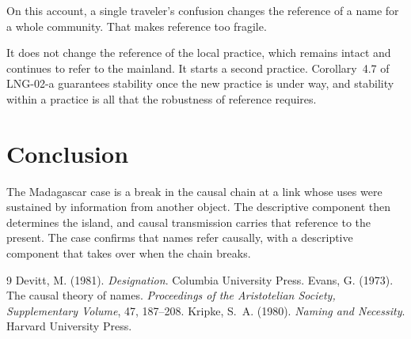 \documentclass{situationist-preprint}
\begin{document}
\begin{objection}
On this account, a single traveler's confusion changes the reference of a name for a whole community. That makes reference too fragile.
\end{objection}

\begin{reply}
It does not change the reference of the local practice, which remains intact and continues to refer to the mainland. It starts a second practice. Corollary~4.7 of LNG-02-a guarantees stability once the new practice is under way, and stability within a practice is all that the robustness of reference requires.
\end{reply}

\section{Conclusion}

The Madagascar case is a break in the causal chain at a link whose uses were sustained by information from another object. The descriptive component then determines the island, and causal transmission carries that reference to the present. The case confirms that names refer causally, with a descriptive component that takes over when the chain breaks.

\begin{thebibliography}{9}\small
{} Devitt, M. (1981). \emph{Designation}. Columbia University Press.
 Evans, G. (1973). The causal theory of names. \emph{Proceedings of the Aristotelian Society, Supplementary Volume}, 47, 187--208.
 Kripke, S.~A. (1980). \emph{Naming and Necessity}. Harvard University Press.
\end{thebibliography}
\end{document}
